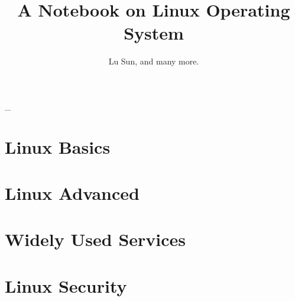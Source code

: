 



\makeindex



\frontmatter

\title{A Notebook on Linux Operating System}
\author{Lu Sun, and many more.}

\maketitle


\tableofcontents


\listoffigures
\listoftables

\mainmatter\_

\part{Linux Basics}







\part{Linux Advanced}




\part{Widely Used Services}
 






\part{Linux Security}



\appendix






\printindex


